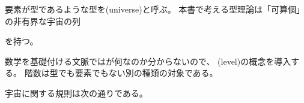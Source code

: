 \documentclass[index]{subfiles}
\begin{document}

要素が型であるような型を(universe)と呼ぶ。
本書で考える型理論は「可算個」の非有界な宇宙の列
\begin{myDisplayMath}
   \myElemOf
   \myElemOf
   \myElemOf
  \myDots
\end{myDisplayMath}
を持つ。

数学を基礎付ける文脈ではが何なのか分からないので、
(level)の概念を導入する。
階数は型でも要素でもない別の種類の対象である。



宇宙に関する規則は次の通りである。


\end{document}
